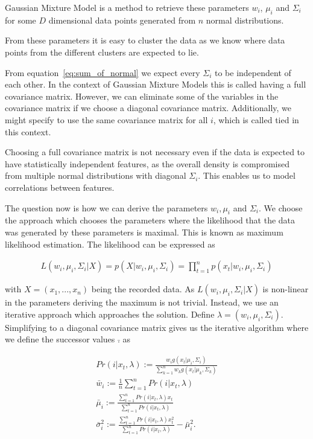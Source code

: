 Gaussian Mixture Model is a method to retrieve these parameters $w_i$, $\mu_i$ and $\Sigma_i$ for some $D$ dimensional data points generated from $n$ normal distributions.

From these parameters it is easy to cluster the data as we know where data points from the different clusters are expected to lie.

From equation~\ref{eq:sum_of_normal} we expect every $\Sigma_i$ to be independent of each other. In the context of Gaussian Mixture Models this is called having a full covariance matrix. However, we can eliminate some of the variables in the covariance matrix if we choose a diagonal covariance matrix. Additionally, we might specify to use the same covariance matrix for all $i$, which is called tied in this context.

Choosing a full covariance matrix is not necessary even if the data is expected to have statistically independent features, as the overall density is compromised from multiple normal distributions with diagonal $\Sigma_i$. This enables us to model correlations between features.

The question now is how we can derive the parameters $w_i, \mu_i$ and $\Sigma_i$. We choose the approach which chooses the parameters where the likelihood that the data was generated by these parameters is maximal. This is known as maximum likelihood estimation. The likelihood can be expressed as

\begin{align*}
	L(w_i, \mu_i, \Sigma_i|X) = p(X|w_i, \mu_i, \Sigma_i) = \prod_{t=1}^n p(x_t|w_i, \mu_i, \Sigma_i)
\end{align*}

with $X = (x_1, ..., x_n)$ being the recorded data. As $L(w_i, \mu_i, \Sigma_i|X)$ is non-linear in the parameters deriving the maximum is not trivial. Instead, we use an iterative approach which approaches the solution. Define $\lambda = (w_i, \mu_i, \Sigma_i)$. Simplifying to a diagonal covariance matrix gives us the iterative algorithm where we define the successor values $\bar{.}$ as

\begin{align*}
	Pr(i | x_t, \lambda) := \frac{w_i g(x_t | \mu_i, \Sigma_i)}{\sum_{k=1}^{n} w_k g(x_t | \mu_k, \Sigma_k)}\\
	\bar{w}_i := \frac{1}{n} \sum_{t=1}^{n} Pr(i | x_t, \lambda)\\
	\bar{\mu}_i := \frac{\sum_{t=1}^{n} Pr(i | x_t, \lambda) x_t}{\sum_{t=1}^{n} Pr(i | x_t, \lambda)}\\
	\bar{\sigma}_i^2 := \frac{\sum_{t=1}^{n} Pr(i | x_t, \lambda) x_t^2}{\sum_{t=1}^{n} Pr(i | x_t, \lambda)} - \bar{\mu}_i^2.
\end{align*}

